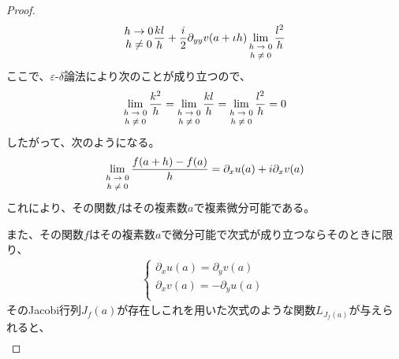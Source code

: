 \documentclass[dvipdfmx]{jsarticle}
\begin{document}
\begin{proof}
\begin{align*}
{\begin{matrix}
h \rightarrow 0 \\
h \neq 0 \\
\end{matrix}}\frac{kl}{h} + \frac{i}{2}\partial_{yy}v(a + \iota h)\lim_{\scriptsize \begin{matrix}
h \rightarrow 0 \\
h \neq 0 \\
\end{matrix}}\frac{l^{2}}{h}
\end{align*}
ここで、$\varepsilon$-$\delta$論法により次のことが成り立つので、
\begin{align*}
\lim_{\scriptsize \begin{matrix}
h \rightarrow 0 \\
h \neq 0 \\
\end{matrix}}\frac{k^{2}}{h} = \lim_{\scriptsize \begin{matrix}
h \rightarrow 0 \\
h \neq 0 \\
\end{matrix}}\frac{kl}{h} = \lim_{\scriptsize \begin{matrix}
h \rightarrow 0 \\
h \neq 0 \\
\end{matrix}}\frac{l^{2}}{h} = 0
\end{align*}
したがって、次のようになる。
\begin{align*}
\lim_{\scriptsize \begin{matrix}
h \rightarrow 0 \\
h \neq 0 \\
\end{matrix}}\frac{f(a + h) - f(a)}{h} = \partial_{x}u(a) + i\partial_{x}v(a)
\end{align*}
これにより、その関数$f$はその複素数$a$で複素微分可能である。\par
また、その関数$f$はその複素数$a$で微分可能で次式が成り立つならそのときに限り、
\begin{align*}
\left\{ \begin{matrix}
\partial_{x}u(a) = \partial_{y}v(a) \\
\partial_{x}v(a) = - \partial_{y}u(a) \\
\end{matrix} \right.\ 
\end{align*}
そのJacobi行列$J_{f}(a)$が存在しこれを用いた次式のような関数$L_{J_{f}(a)}$が与えられると、
\begin{align*}

\end{align*}
\end{proof}
\end{document}

